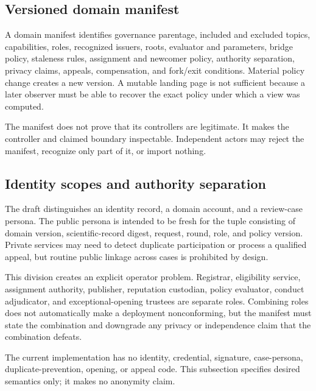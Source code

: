 \documentclass[11pt]{article}
\begin{document}

\subsection{Versioned domain manifest}

A domain manifest identifies governance parentage, included and excluded topics,
capabilities, roles, recognized issuers, roots, evaluator and parameters, bridge
policy, staleness rules, assignment and newcomer policy, authority separation,
privacy claims, appeals, compensation, and fork/exit conditions. Material policy
change creates a new version. A mutable landing page is not sufficient because a
later observer must be able to recover the exact policy under which a view was
computed.

The manifest does not prove that its controllers are legitimate. It makes the
controller and claimed boundary inspectable. Independent actors may reject the
manifest, recognize only part of it, or import nothing.

\subsection{Identity scopes and authority separation}

The draft distinguishes an identity record, a domain account, and a review-case
persona. The public persona is intended to be fresh for the tuple consisting of
domain version, scientific-record digest, request, round, role, and policy version.
Private services may need to detect duplicate participation or process a qualified
appeal, but routine public linkage across cases is prohibited by design.

This division creates an explicit operator problem. Registrar, eligibility service,
assignment authority, publisher, reputation custodian, policy evaluator, conduct
adjudicator, and exceptional-opening trustees are separate roles. Combining roles
does not automatically make a deployment nonconforming, but the manifest must
state the combination and downgrade any privacy or independence claim that the
combination defeats.

\begin{evidencegate}
The current implementation has no identity, credential, signature, case-persona,
duplicate-prevention, opening, or appeal code. This subsection specifies desired
semantics only; it makes no anonymity claim.
\end{evidencegate}
\end{document}
